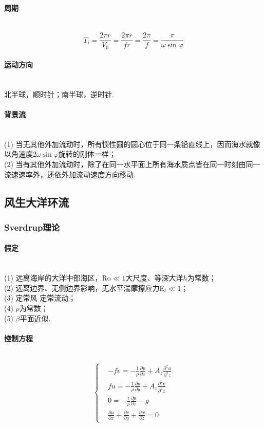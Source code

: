 \documentclass[a4paper,12pt]{article}
\begin{document}
    \paragraph{周期}~{}
     \[
        T_{i}=\frac{2 \pi r}{V_{0}}=\frac{2 \pi r}{f r}=\frac{2 \pi}{f}=\frac{\pi}{\omega \sin \varphi}
     \]
     \paragraph{运动方向}~{}\\
     北半球，顺时针；南半球，逆时针.
    \paragraph{背景流}~{}\\
    (1) 当无其他外加流动时，所有惯性圆的圆心位于同一条铅直线上，因而海水就像以角速度$2\omega \sin \varphi$旋转的刚体一样；\\
    (2) 当有其他外加流动时，除了在同一水平面上所有海水质点皆在同一时刻由同一流速速率外，还依外加流动速度方向移动.
    \newpage
    \subsection{风生大洋环流}
    \subsubsection{Sverdrup理论}
    \paragraph{假定}~{}\\
    (1) 远离海岸的大洋中部海区，Ro$\ll 1$大尺度、等深大洋$h$为常数；\\
    (2) 远离边界、无侧边界影响，无水平湍摩擦应力E$_l\ll 1$；\\
    (3) 定常风 定常流动；\\
    (4) $\rho$为常数；\\
    (5) $\beta$平面近似.\\
    \paragraph{控制方程}~{}
    \[
        \left\{
            \begin{aligned}
                &-f v=-\frac{1}{\rho} \frac{\partial p}{\partial x}+A_{z} \frac{\partial^{2} u}{\partial^{2} z} \\
                &fu=-\frac{1}{\rho} \frac{\partial p}{\partial y}+A_{z} \frac{\partial^{2} v}{\partial^{2} z} \\
                &0=-\frac{1}{\rho} \frac{\partial p}{\partial z}-g\\
                &\frac{\partial u}{\partial x}+\frac{\partial v}{\partial y}+\frac{\partial w}{\partial z}=0
            \end{aligned}
        \right.
    \]
\end{document}
